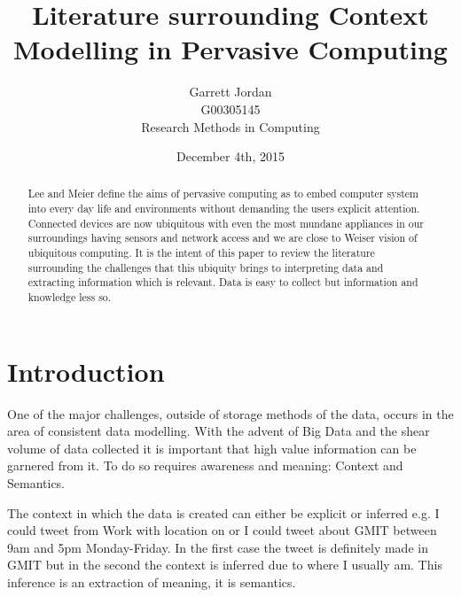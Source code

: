 \documentclass[]{report}
\title{Literature surrounding Context Modelling in Pervasive Computing}
\author{Garrett Jordan\\G00305145\\Research Methods in Computing}
\date{December 4th, 2015}
\begin{document}
\maketitle


% 
%

\begin{abstract}
Lee and Meier define the aims of pervasive computing as to embed computer system into every day life and environments without demanding the users explicit attention\cite{0}. Connected devices are now ubiquitous with even the most mundane appliances in our surroundings having sensors and network access and we are close to Weiser vision of ubiquitous computing\cite{1}. It is the intent of this paper to review the literature surrounding the challenges that this ubiquity brings to interpreting data and  extracting information which is relevant. Data is easy to collect but information and knowledge less so.
\end{abstract}

% 
%

\section*{Introduction}
One of the major challenges, outside of storage methods of the data, occurs in the area of consistent data modelling. With the advent of Big Data and the shear volume of data collected it is important that high value information can be garnered from it. To do so requires awareness and meaning: Context and Semantics.\par
The context in which the data is created can either be explicit or inferred e.g. I could tweet from Work with location on or I could tweet about GMIT between 9am and 5pm Monday-Friday. In the first case the tweet is definitely made in GMIT but in the second the context is inferred due to where I usually am. This inference is an extraction of meaning, it is semantics. \par 

% 
%
\end{document}
